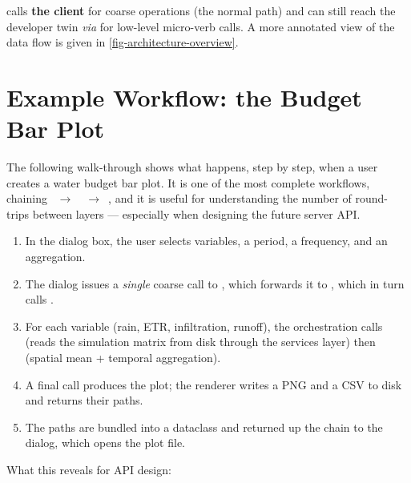  calls \textbf{the client} for coarse operations (the normal path) and can still reach the developer twin \textit{via}  for low-level micro-verb calls. A more annotated view of the data flow is given in \cref{fig-architecture-overview}.


\section{Example Workflow: the Budget Bar Plot}
\label{sec-example-workflow}

The following walk-through shows what happens, step by step, when a user creates a water budget bar plot. It is one of the most complete workflows, chaining ~$\rightarrow$~~$\rightarrow$~, and it is useful for understanding the number of round-trips between layers --- especially when designing the future server API.

\begin{enumerate}
    \item In the  dialog box, the user selects variables, a period, a frequency, and an aggregation.
    \item The dialog issues a \emph{single} coarse call to , which forwards it to , which in turn calls .
    \item For each variable (rain, ETR, infiltration, runoff), the orchestration calls  (reads the simulation matrix from disk through the services layer) then  (spatial mean + temporal aggregation).
    \item A final  call produces the plot; the renderer writes a PNG and a CSV to disk and returns their paths.
    \item The paths are bundled into a  dataclass and returned up the chain to the dialog, which opens the plot file.
\end{enumerate}

What this reveals for API design:

